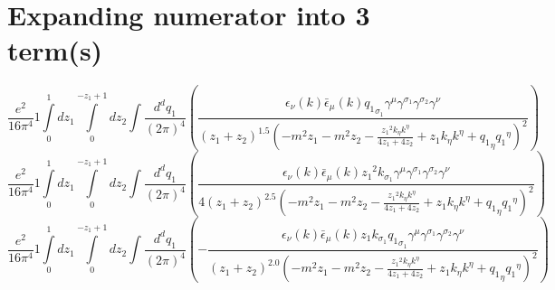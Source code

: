 \section*{Expanding numerator into 3 term(s)}
\begin{dmath}\frac{e^{2}}{16 \pi^{4}}1\int\limits_{ 0 }^{ 1 } d{ z_{ 1 } }\int\limits_{ 0 }^{ - { z_{ 1 } } + 1 } d{ z_{ 2 } }\int\frac{d^d q_1 }{ (2\pi)^4 }\left(\frac{\epsilon_{ \nu }({ k }) \bar{\epsilon}_{ \mu }({ k }) { { q_1 }_{ \sigma_1 } } { \gamma^{ \mu } } { \gamma^{ \sigma_1 } } { \gamma^{ \sigma_2 } } { \gamma^{ \nu } }}{\left({ z_{ 1 } } + { z_{ 2 } }\right)^{1.5} \left(- m^{2} { z_{ 1 } } - m^{2} { z_{ 2 } } - \frac{{ z_{ 1 } }^{2} { { k }_{ \eta } } { { k }^{ \eta } }}{4 { z_{ 1 } } + 4 { z_{ 2 } }} + { z_{ 1 } } { { k }_{ \eta } } { { k }^{ \eta } } + { { q_1 }_{ \eta } } { { q_1 }^{ \eta } }\right)^{2}}\right)\end{dmath}
\begin{dmath}\frac{e^{2}}{16 \pi^{4}}1\int\limits_{ 0 }^{ 1 } d{ z_{ 1 } }\int\limits_{ 0 }^{ - { z_{ 1 } } + 1 } d{ z_{ 2 } }\int\frac{d^d q_1 }{ (2\pi)^4 }\left(\frac{\epsilon_{ \nu }({ k }) \bar{\epsilon}_{ \mu }({ k }) { z_{ 1 } }^{2} { { k }_{ \sigma_1 } } { \gamma^{ \mu } } { \gamma^{ \sigma_1 } } { \gamma^{ \sigma_2 } } { \gamma^{ \nu } }}{4 \left({ z_{ 1 } } + { z_{ 2 } }\right)^{2.5} \left(- m^{2} { z_{ 1 } } - m^{2} { z_{ 2 } } - \frac{{ z_{ 1 } }^{2} { { k }_{ \eta } } { { k }^{ \eta } }}{4 { z_{ 1 } } + 4 { z_{ 2 } }} + { z_{ 1 } } { { k }_{ \eta } } { { k }^{ \eta } } + { { q_1 }_{ \eta } } { { q_1 }^{ \eta } }\right)^{2}}\right)\end{dmath}
\begin{dmath}\frac{e^{2}}{16 \pi^{4}}1\int\limits_{ 0 }^{ 1 } d{ z_{ 1 } }\int\limits_{ 0 }^{ - { z_{ 1 } } + 1 } d{ z_{ 2 } }\int\frac{d^d q_1 }{ (2\pi)^4 }\left(- \frac{\epsilon_{ \nu }({ k }) \bar{\epsilon}_{ \mu }({ k }) { z_{ 1 } } { { k }_{ \sigma_1 } } { { q_1 }_{ \sigma_1 } } { \gamma^{ \mu } } { \gamma^{ \sigma_1 } } { \gamma^{ \sigma_2 } } { \gamma^{ \nu } }}{\left({ z_{ 1 } } + { z_{ 2 } }\right)^{2.0} \left(- m^{2} { z_{ 1 } } - m^{2} { z_{ 2 } } - \frac{{ z_{ 1 } }^{2} { { k }_{ \eta } } { { k }^{ \eta } }}{4 { z_{ 1 } } + 4 { z_{ 2 } }} + { z_{ 1 } } { { k }_{ \eta } } { { k }^{ \eta } } + { { q_1 }_{ \eta } } { { q_1 }^{ \eta } }\right)^{2}}\right)\end{dmath}
